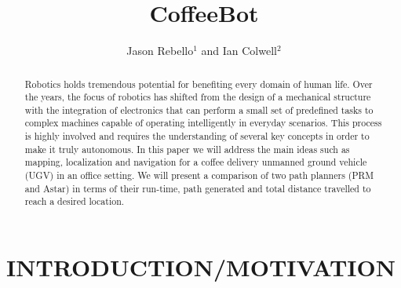 \documentclass[letterpaper, 10 pt, conference]{ieeeconf}  %
\title{\LARGE \bf
CoffeeBot
}
\author{Jason Rebello$^{1}$ and Ian Colwell$^{2}$%
}
\begin{document}
\maketitle
\thispagestyle{empty}
\pagestyle{empty}


\begin{abstract}

Robotics holds tremendous potential for benefiting every domain of human life. Over the years, the focus of robotics has shifted from the design of a mechanical structure with the integration of electronics that can perform a small set of predefined tasks to complex machines capable of operating intelligently in everyday scenarios. This process is highly involved and requires the understanding of several key concepts in order to make it truly autonomous. In this paper we will address the main ideas such as mapping, localization and navigation for a coffee delivery unmanned ground vehicle (UGV) in an office setting. We will present a comparison of two path planners (PRM and Astar) in terms of their run-time, path generated and total distance travelled to reach a desired location.

\end{abstract}

\section{INTRODUCTION/MOTIVATION}
\end{document}
